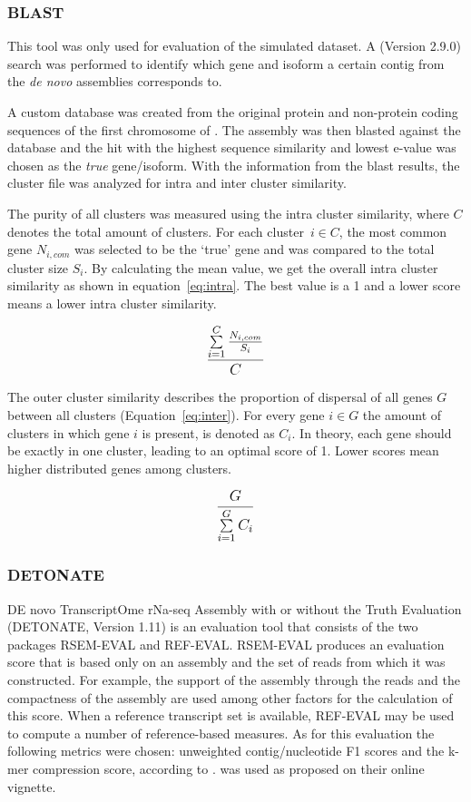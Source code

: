 \documentclass[12pt,a4paper,english]{article}
\begin{document}
\subsubsection*{BLAST}
	This tool was only used for evaluation of the simulated dataset.
	A \blast (Version 2.9.0) \citep{blast:90} search was performed to identify which gene and isoform a certain contig from the \textit{de novo} assemblies corresponds to.
	
	A custom database was created from the original protein and non-protein coding sequences of the first chromosome of \celegans.
	The assembly was then blasted against the database and the hit with the highest sequence similarity and lowest e-value was chosen as the \textit{true} gene/isoform. With the information from the blast results, the cluster file was analyzed for intra and inter cluster similarity.
	
	The purity of all clusters was measured using the intra cluster similarity, where $ C $ denotes the total amount of clusters. For each cluster~$ i \in C $, the most common gene $ N_{i, com} $ was selected to be the `true' gene and was compared to the total cluster size $ S_{i} $. By calculating the mean value, we get the overall intra cluster similarity as shown in equation~\ref{eq:intra}. The best value is a 1 and a lower score means a lower intra cluster similarity.
 
	\begin{equation}
		\label{eq:intra}
		\mathlarger{\frac{\sum\limits_{i=1}^{C}\frac{N_{i, com}}{S_{i}}}{C} }
	\end{equation}

	The outer cluster similarity describes the proportion of dispersal of all genes $G$ between all clusters (Equation~\ref{eq:inter}). For every gene $i \in G$ the amount of clusters in which gene $i$ is present, is denoted as $ C_{i} $. In theory, each gene should be exactly in one cluster, leading to an optimal score of 1. Lower scores mean higher distributed genes among clusters.

	
	\begin{equation}
	\label{eq:inter}
	\mathlarger{\frac{G}{\sum\limits_{i=1}^{G} C_{i} }}  
	\end{equation}


\subsubsection*{DETONATE}
	DE novo TranscriptOme rNa-seq Assembly with or without the Truth Evaluation (DETONATE, Version 1.11) \citep{DETONATE:14} is an evaluation tool that consists of the two packages RSEM-EVAL and REF-EVAL.
	RSEM-EVAL produces an evaluation score that is based only on an assembly and the set of reads from which it was constructed.
	For example, the support of the assembly through the reads and the compactness of the assembly are used among other factors for the calculation of this score.
	When a reference transcript set is available, REF-EVAL may be used to compute a number of reference-based measures. As for this evaluation the following metrics were chosen: unweighted contig/nucleotide F1 scores and the k-mer compression score, according to \citet{hoelzer:19}.
	\detonate was used as proposed on their online vignette.
\end{document}
